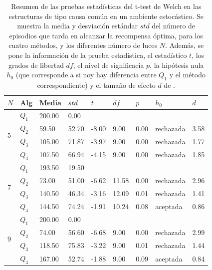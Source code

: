 \begin{table}[]
\centering
\caption{\footnotesize{Resumen de las pruebas estadísticas del t-test de Welch en las
estructuras de tipo causa común en un ambiente estocástico. Se muestra la media y desviación estándar $std$ del número 
de episodios que tarda en alcanzar la recompensa óptima, para los cuatro métodos, y los diferentes número de luces $N$. Además, se pone la información
de la prueba estadística, el estadístico $t$, los grados de libertad $df$, el nivel
de significacia $p$, la hipótesis nula $h_0$ (que corresponde a si noy hay diferencia entre $Q_1$ y el método correspondiente) y el tamaño de efecto $d$ de \citet{cohen2013statistical}.}}
\label{tab:dqn-common-cause-sto}
\begin{tabular}{|l|l|l|l|l|l|l|l|l|}
\hline
$N$ & Alg & Media & $std$ & $t$ & $df$ & $p$ & $h_0$ & $d$ \\ \hline
\multirow{4}{*}{5} & $Q_1$ & 200.00 & 0.00 & \multicolumn{5}{l|}{} \\ \cline{2-9} 
 & $Q_2$ & 59.50 & 52.70 & -8.00 & 9.00 & 0.00 & rechazada & 3.58 \\ \cline{2-9} 
 & $Q_3$ & 105.00 & 71.87 & -3.97 & 9.00 & 0.00 & rechazada & 1.77 \\ \cline{2-9} 
 & $Q_4$ & 107.50 & 66.94 & -4.15 & 9.00 & 0.00 & rechazada & 1.85 \\ \hline
\multirow{4}{*}{7} & $Q_1$ & 193.50 & 19.50 & \multicolumn{5}{l|}{} \\ \cline{2-9} 
 & $Q_2$ & 73.00 & 51.00 & -6.62 & 11.58 & 0.00 & rechazada & 2.96 \\ \cline{2-9} 
 & $Q_3$ & 140.50 & 46.34 & -3.16 & 12.09 & 0.01 & rechazada & 1.41 \\ \cline{2-9} 
 & $Q_4$ & 144.50 & 74.24 & -1.91 & 10.24 & 0.08 & aceptada & 0.86 \\ \hline
\multirow{4}{*}{9} & $Q_1$ & 200.00 & 0.00 & \multicolumn{5}{l|}{} \\ \cline{2-9} 
 & $Q_2$ & 74.00 & 56.60 & -6.68 & 9.00 & 0.00 & rechazada & 2.99 \\ \cline{2-9} 
 & $Q_3$ & 118.50 & 75.83 & -3.22 & 9.00 & 0.01 & rechazada & 1.44 \\ \cline{2-9} 
 & $Q_4$ & 167.00 & 52.74 & -1.88 & 9.00 & 0.09 & aceptada & 0.84 \\ \hline
\end{tabular}
\end{table}


